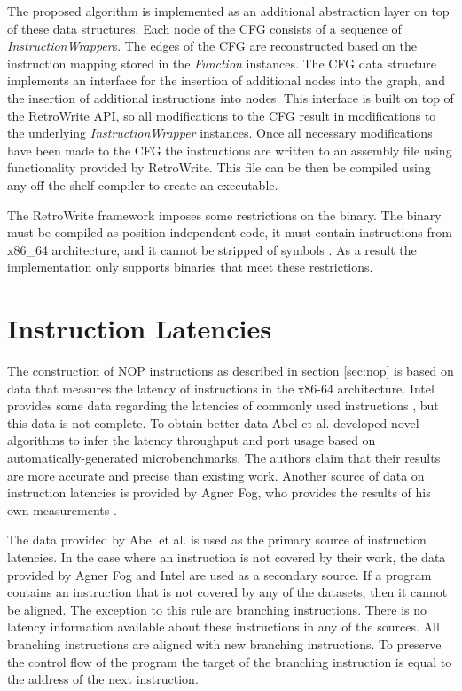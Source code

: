 The proposed algorithm is implemented as an additional abstraction layer on top of these data structures. 
Each node of the CFG consists of a sequence of \textit{InstructionWrapper}s. 
The edges of the CFG are reconstructed based on the instruction mapping stored in the \textit{Function} instances. 
The CFG data structure implements  an interface for the insertion of additional nodes into the graph, and the insertion of additional instructions into nodes. 
This interface is built on top of the RetroWrite API, so all modifications to the CFG result in modifications to the underlying \textit{InstructionWrapper} instances. 
Once all necessary modifications have been made to the CFG the instructions are written to an assembly file using functionality provided by RetroWrite. 
This file can be then be compiled using any off-the-shelf compiler to create an executable. 

The RetroWrite framework imposes some restrictions on the binary. The binary must be compiled as position independent code, it must contain instructions from x86\_64 architecture, and 
it cannot be stripped of symbols \cite{hexhive}. 
As a result the implementation only supports binaries that meet these restrictions. 


\section{Instruction Latencies}
\label{sec:latencies}
The construction of NOP instructions as described in section \ref{sec:nop} is based on data that measures the latency of instructions in the x86-64 architecture.
Intel provides some data regarding the latencies of commonly used instructions \cite{intel-ref-manual}, but this data is not complete.
To obtain better data Abel et al.  \cite{uops} developed novel algorithms to infer the latency throughput and port usage based on automatically-generated microbenchmarks. 
The authors claim that their results are more accurate and precise than existing work. 
Another source of data on instruction latencies is provided by Agner Fog, who provides the results of his own measurements \cite{fog_2021}. 

The data provided by Abel et al. \cite{uops} is  used as the primary source of instruction latencies. In the case where an instruction is not covered by their work, the data 
provided by Agner Fog \cite{fog_2021} and Intel are used as a secondary source. If a program contains an instruction that is not covered by any of the datasets, then it cannot
be aligned. 
The exception to this rule are branching instructions. 
There is no latency information available about these instructions in any of the sources. 
All branching instructions are aligned with new branching instructions. 
To preserve the control flow of the program the target of the branching instruction is equal to the address of the next instruction. 
